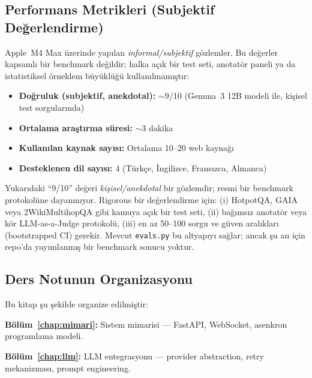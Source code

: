 \documentclass[12pt,a4paper,oneside]{book}
\theoremstyle{definition}
\begin{document}
\subsection{Performans Metrikleri (Subjektif De\u{g}erlendirme)}

Apple~M4 Max \"{u}zerinde yap{\i}lan \emph{informal/subjektif} g\"{o}zlemler. Bu de\u{g}erler kapsaml{\i} bir benchmark de\u{g}ildir; halka a\c{c}{\i}k bir test seti, anotat\"{o}r paneli ya da istatistiksel \"{o}rneklem b\"{u}y\"{u}kl\"{u}\u{g}\"{u} kullan{\i}lmam{\i}\c{s}t{\i}r:
\begin{itemize}
  \item \textbf{Do\u{g}ruluk (subjektif, anekdotal):} $\sim$9/10 (Gemma~3 12B modeli ile, ki\c{s}isel test sorgular{\i}nda)
  \item \textbf{Ortalama ara\c{s}t{\i}rma s\"{u}resi:} $\sim$3 dakika
  \item \textbf{Kullan{\i}lan kaynak say{\i}s{\i}:} Ortalama 10--20 web kayna\u{g}{\i}
  \item \textbf{Desteklenen dil say{\i}s{\i}:} 4 (T\"{u}rk\c{c}e, \.{I}ngilizce, Frans{\i}zca, Almanca)
\end{itemize}

\begin{kritik}
Yukar{\i}daki ``9/10'' de\u{g}eri \emph{ki\c{s}isel/anekdotal} bir g\"{o}zlemdir; resmi bir benchmark protokol\"{u}ne dayanm{\i}yor. Rigorous bir de\u{g}erlendirme i\c{c}in: (i) HotpotQA, GAIA veya 2WikiMultihopQA gibi kamuya a\c{c}{\i}k bir test seti, (ii) ba\u{g}{\i}ms{\i}z anotat\"{o}r veya k\"{o}r LLM-as-a-Judge protokol\"{u}, (iii) en az 50--100 sorgu ve g\"{u}ven aral{\i}klar{\i} (bootstrapped CI) gerekir. Mevcut \texttt{evals.py} bu altyap{\i}y{\i} sa\u{g}lar; ancak \c{s}u an i\c{c}in repo'da yay{\i}mlanm{\i}\c{s} bir benchmark sonucu yoktur.
\end{kritik}

\subsection{Ders Notunun Organizasyonu}

Bu kitap \c{s}u \c{s}ekilde organize edilmi\c{s}tir:

\textbf{B\"{o}l\"{u}m~\ref{chap:mimari}:} Sistem mimarisi --- FastAPI, WebSocket, asenkron programlama modeli.

\textbf{B\"{o}l\"{u}m~\ref{chap:llm}:} LLM entegrasyonu --- provider abstraction, retry mekanizmas{\i}, prompt engineering.
\end{document}

